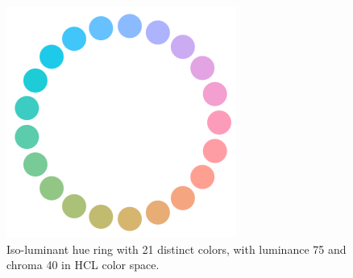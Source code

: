 \documentclass{egpubl}
\begin{document}
	\begin{figure}
\centering
\includegraphics[width=0.3\linewidth]{Figures/hueWheel.png}
\caption{Iso-luminant hue ring with 21 distinct colors, with luminance 75 and chroma 40 in HCL color space.}
\label{fig:hueWheel}
\end{figure}

			
\end{document}
